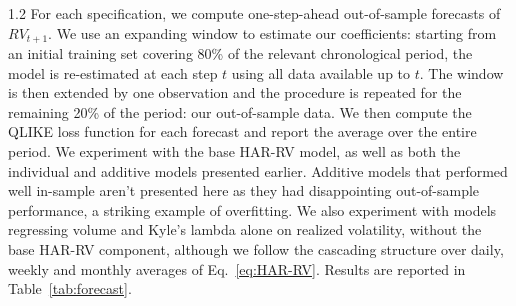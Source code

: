 \documentclass[10pt]{article}
\begin{document}
\begin{setstretch}{1.2}
For each specification, we compute one-step-ahead out-of-sample forecasts of $RV_{t+1}$. We use an expanding window to estimate our coefficients: starting from an initial training set covering 80\% of the relevant chronological period, the model is re-estimated at each step $t$ using all data available up to $t$. The window is then extended by one observation and the procedure is repeated for the remaining 20\% of the period: our out-of-sample data. We then compute the QLIKE loss function for each forecast and report the average over the entire period. We experiment with the base HAR-RV model, as well as both the individual and additive models presented earlier. Additive models that performed well in-sample aren't presented here as they had disappointing out-of-sample performance, a striking example of overfitting. We also experiment with models regressing volume and Kyle's lambda alone on realized volatility, without the base HAR-RV component, although we follow the cascading structure over daily, weekly and monthly averages of Eq.~\ref{eq:HAR-RV}. Results are reported in Table~\ref{tab:forecast}. 


\end{setstretch}
\end{document}
